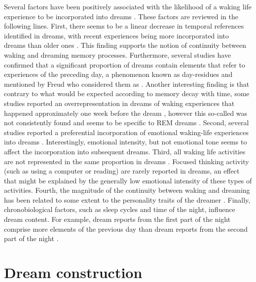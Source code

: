 Several factors have been positively associated with the likelihood of a waking life experience to be incorporated into dreams \citep{schredl_characteristics_2010}. These factors are reviewed in the following lines. First, there seems to be a linear decrease in temporal references identified in dreams, with recent experiences being more incorporated into dreams than older ones \citep{botman_dream_1990, strauch_dem_2004, grenier_temporal_2005}. This finding supports the notion of continuity between waking and dreaming memory processes. Furthermore, several studies \citep{botman_dream_1990, nielsen_day-residue_1992, marquardt_empirical_1996} have confirmed that a significant proportion of dreams contain elements that refer to experiences of the preceding day, a phenomenon known as day-residues and mentioned by Freud who considered them as  \citep{freud_interpretation_1900}. Another interesting finding is that contrary to what would be expected according to memory decay with time, some studies reported an overrepresentation in dreams of waking experiences that happened approximately one week before the dream \citep{nielsen_day-residue_1992, marquardt_empirical_1996, blagrove_replication_2011}, however this so-called  was not consistently found and seems to be specific to REM dreams \citep{blagrove_assessing_2011, van_rijn_dream-lag_2015}.
Second, several studies reported a preferential incorporation of emotional waking-life experiences into dreams \citep{malinowski_evidence_2014, schredl_factors_2006}. Interestingly, emotional intensity, but not emotional tone seems to affect the incorporation into subsequent dreams.
Third, all waking life activities are not represented in the same proportion in dreams \citep{hartmann_we_1996, schredl_continuity_2000}. Focused thinking activity (such as using a computer or reading) are rarely reported in dreams, an effect that might be explained by the generally low emotional intensity of these types of activities. Fourth, the magnitude of the continuity between waking and dreaming has been related to some extent to the personality traits of the dreamer \citep{schredl_dreaming_1996}. Finally, chronobiological factors, such as sleep cycles and time of the night, influence dream content. For example, dream reports from the first part of the night comprise more elements of the previous day than dream reports from the second part of the night \citep{roffwarg_effects_1978}.

\section{Dream construction}
\label{sec:dream-content:construction}

